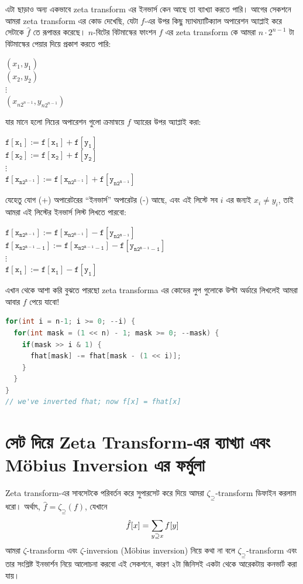 এটা ছাড়াও অন্য একভাবে zeta transform এর ইনভার্স কেন আছে তা ব্যাখ্যা করতে
পারি। আগের সেকশনে আমরা zeta transform এর কোড দেখেছি, যেটা $f$-এর উপর
কিছু ম্যাথম্যাটিক্যাল অপারেশন অ্যাপ্লাই করে সেটাকে $\hat{f}$ তে রূপান্তর
করেছে। $n$-বিটের বিটমাস্কের ফাংশন $f$ এর zeta transform কে আমরা $n \cdot
2^{n-1}$ টা বিটমাস্কের পেয়ার দিয়ে প্রকাশ করতে পারি:
\begin{center}
  $(x_1, y_1)$\\
  $(x_2, y_2)$\\
  $\vdots$\\
  $(x_{n 2^{n-1}}, y_{n 2^{n-1}})$
\end{center}
যার মানে হলো নিচের অপারেশন গুলো ক্রমান্বয়ে $f$ অ্যারের উপর অ্যাপ্লাই করা:
\begin{center}
  $\mathtt{f[x_1] := f[x_1] + f[y_1]}$\\
  $\mathtt{f[x_2] := f[x_2] + f[y_2]}$\\
  $\vdots$\\
  $\mathtt{f[x_{n 2^{n-1}}] := f[x_{n 2^{n-1}}] + f[y_{n 2^{n-1}}]}$
\end{center}
যেহেতু যোগ (+) অপারেটরের ``ইনভার্স'' অপারেটর (-) আছে, এবং এই লিস্টে সব $i$ এর
জন্যই $x_i \ne y_i$, তাই আমরা এই লিস্টের ইনভার্স লিস্ট লিখতে পারবো:
\begin{center}
  $\mathtt{f[x_{n 2^{n-1}}] := f[x_{n 2^{n-1}}] - f[y_{n 2^{n-1}}]}$\\
  $\mathtt{f[x_{n 2^{n-1} - 1}] := f[x_{n 2^{n-1} - 1}] - f[y_{n 2^{n-1} -
  1}]}$\\
  $\vdots$\\
  $\mathtt{f[x_1] := f[x_1] - f[y_1]}$
\end{center}
এখান থেকে আশা করি বুঝতে পারছো zeta transforma এর কোডের লুপ গুলোকে উল্টা
অর্ডারে লিখলেই আমরা আবার $f$ পেয়ে যাবো!
\begin{lstlisting}[language=C++]
for(int i = n-1; i >= 0; --i) {
  for(int mask = (1 << n) - 1; mask >= 0; --mask) {
    if(mask >> i & 1) {
      fhat[mask] -= fhat[mask - (1 << i)];
    }
  }
}
// we've inverted fhat; now f[x] = fhat[x]
\end{lstlisting}

\section{সেট দিয়ে Zeta Transform-এর ব্যাখ্যা এবং M{\"o}bius Inversion এর ফর্মুলা}
Zeta transform-এর সাবসেটকে পরিবর্তন করে সুপারসেট করে দিয়ে আমরা
$\zeta_{\supseteq}$-transform ডিফাইন করলাম ধরো। অর্থাৎ, $\hat{f} =
\zeta_{\supseteq}(f)$, যেখানে
\[
  \hat{f}[x] = \sum_{y \supseteq x} f[y]
\]
আমরা $\zeta$-transform এবং $\zeta$-inversion (M{\"o}bius inversion) নিয়ে কথা
না বলে $\zeta_{\supseteq}$-transform এবং তার সংশ্লিষ্ট ইনভার্শন নিয়ে আলোচনা
করবো এই সেকশনে, কারণ ২টা জিনিসই একটা থেকে আরেকটায় কনভার্ট করা যায়।

